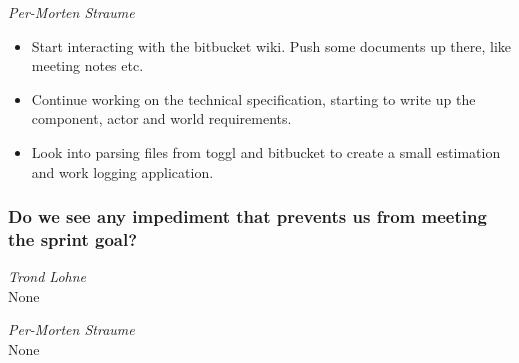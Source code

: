 \documentclass{article}
\begin{document}
\medskip

\noindent\textit{Per-Morten Straume}\\
\begin{itemize}
    \item
    Start interacting with the bitbucket wiki. 
    Push some documents up there, like meeting notes etc.

    \item
    Continue working on the technical specification, 
    starting to write up the component, actor and world requirements.

    \item
    Look into parsing files from toggl and bitbucket to create a small estimation and work logging application.
\end{itemize}

\subsubsection*{Do we see any impediment that prevents us from meeting the sprint goal?}

\noindent\textit{Trond Lohne}\\
None

\medskip

\noindent\textit{Per-Morten Straume}\\
None


\newpage
\end{document}
